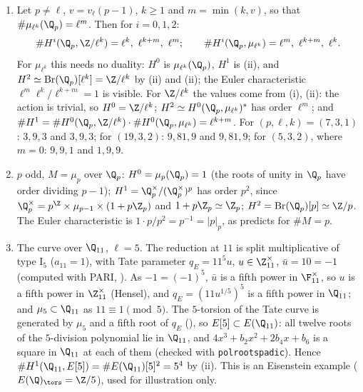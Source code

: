 \begin{example}\label{ex:galcoh:local-orders}
\begin{enumerate}[label=(\alph*)]
\item Let $p\ne\ell$, $v=v_\ell(p-1)$, $k\ge1$ and $m=\min(k,v)$, so that $\#\mu_{\ell^k}(\Q_p)=\ell^m$. Then for $i=0,1,2$:
\[
\#H^i(\Q_p,\Z/\ell^k)=\ell^k,\ \ell^{k+m},\ \ell^m;\qquad\#H^i(\Q_p,\mu_{\ell^k})=\ell^m,\ \ell^{k+m},\ \ell^k .
\]
For $\mu_{\ell^k}$ this needs no duality: $H^0$ is $\mu_{\ell^k}(\Q_p)$, $H^1$ is (ii), and $H^2\simeq\operatorname{Br}(\Q_p)[\ell^k]=\Z/\ell^k$ by
(ii) and (ii); the Euler characteristic $\ell^m\ell^k/\ell^{k+m}=1$ is visible. For $\Z/\ell^k$ the values come from
(i), (ii): the action is trivial, so $H^0=\Z/\ell^k$; $H^2\simeq H^0(\Q_p,\mu_{\ell^k})^*$ has order $\ell^m$; and
$\#H^1=\#H^0(\Q_p,\Z/\ell^k)\cdot\#H^0(\Q_p,\mu_{\ell^k})=\ell^{k+m}$. For $(p,\ell,k)=(7,3,1)$: $3,9,3$ and $3,9,3$; for $(19,3,2)$: $9,81,9$ and $9,81,9$; for $(5,3,2)$, where $m=0$:
$9,9,1$ and $1,9,9$.
\item $p$ odd, $M=\mu_p$ over $\Q_p$: $H^0=\mu_p(\Q_p)=1$ (the roots of unity in $\Q_p$ have order dividing $p-1$); $H^1=\Q_p^\times/(\Q_p^\times)^p$ has order $p^2$,
since $\Q_p^\times=p^{\Z}\times\mu_{p-1}\times(1+p\Z_p)$ and $1+p\Z_p\simeq\Z_p$; $H^2=\operatorname{Br}(\Q_p)[p]\simeq\Z/p$. The Euler characteristic is $1\cdot p/p^2=p^{-1}=|p|_p$, as
 predicts for $\#M=p$.
\item The curve  over $\Q_{11}$, $\ell=5$. The reduction at $11$ is split multiplicative of type $\mathrm I_5$ ($a_{11}=1$), with Tate parameter
$q_E=11^5u$, $u\in\Z_{11}^\times$, $\bar u=10=-1$ (computed with PARI, ). As $-1=(-1)^5$, $\bar u$ is a fifth power in $\F_{11}^\times$,
so $u$ is a fifth power in $\Z_{11}^\times$ (Hensel), and $q_E=(11u^{1/5})^5$ is a fifth power in $\Q_{11}$; and $\mu_5\subset\Q_{11}$ as $11\equiv1\pmod5$. The
$5$-torsion of the Tate curve is generated by $\mu_5$ and a fifth root of $q_E$ (), so $E[5]\subset E(\Q_{11})$: all twelve roots of the
$5$-division polynomial lie in $\Q_{11}$, and $4x^3+b_2x^2+2b_4x+b_6$ is a square in $\Q_{11}$ at each of them (checked with \texttt{polrootspadic}). Hence
$\#H^1(\Q_{11},E[5])=\#E(\Q_{11})[5]^2=5^4$ by (ii). This is an Eisenstein example ($E(\Q)_{\tors}=\Z/5$), used for illustration
only.
\end{enumerate}
\end{example}

